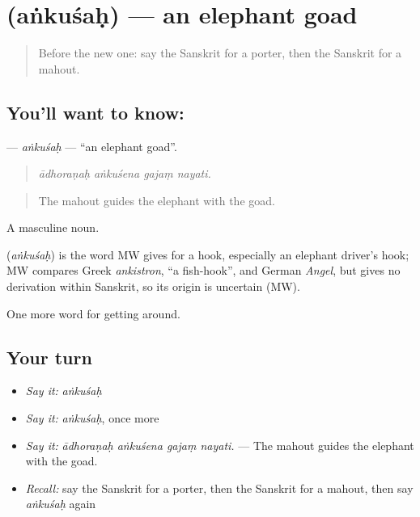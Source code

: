 \section[\texorpdfstring{\sk{अंकुशः} (aṅkuśaḥ)}{अंकुशः (aṅkuśaḥ)}]{ (aṅkuśaḥ) — an elephant goad}

\label{lesson:SA-C408-ankusah}



\begin{quote}
Before the new one: say the Sanskrit for a porter, then the Sanskrit for a mahout.
\end{quote}

\subsection*{You'll want to know: }
\textbf{} — \emph{aṅkuśaḥ} — \textquotedblleft{}an elephant goad\textquotedblright{}.

\begin{quote}
   
\end{quote}

\begin{quote}
\emph{ādhoraṇaḥ aṅkuśena gajaṃ nayati.}
\end{quote}

\begin{quote}
The mahout guides the elephant with the goad.
\end{quote}

A masculine noun.

\begin{cousinweb}
\textbf{} (\emph{aṅkuśaḥ}) is the word MW gives for a hook, especially an elephant driver's hook; MW compares Greek \emph{ankistron}, \textquotedblleft{}a fish-hook\textquotedblright{}, and German \emph{Angel}, but gives no derivation within Sanskrit, so its origin is uncertain (MW).
\end{cousinweb}

\begin{grammarlens}[title={What you've built}]
One more word for getting around.
\end{grammarlens}

\subsection*{Your turn}
\begin{itemize}
\raggedright
  \item \emph{Say it:} \emph{aṅkuśaḥ}
  \item \emph{Say it:} \emph{aṅkuśaḥ}, once more
  \item \emph{Say it:} \emph{ādhoraṇaḥ aṅkuśena gajaṃ nayati.} — The mahout guides the elephant with the goad.
  \item \emph{Recall:} say the Sanskrit for a porter, then the Sanskrit for a mahout, then say \emph{aṅkuśaḥ} again
\end{itemize}

